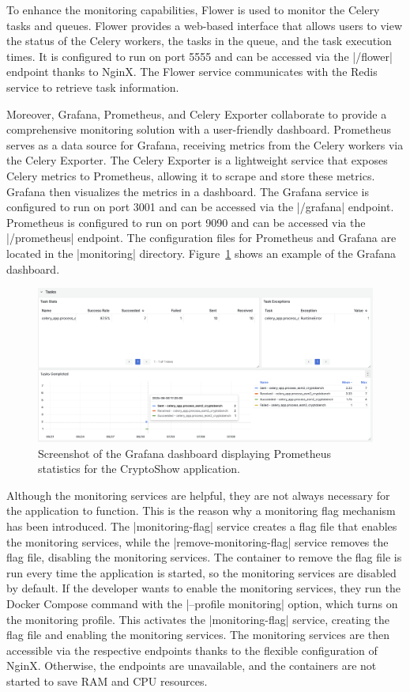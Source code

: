 To enhance the monitoring capabilities, Flower is used to monitor the Celery tasks and queues. Flower provides a web-based interface that allows users to view the status of the Celery workers, the tasks in the queue, and the task execution times. It is configured to run on port 5555 and can be accessed via the \inline|/flower| endpoint thanks to NginX. The Flower service communicates with the Redis service to retrieve task information.

Moreover, Grafana, Prometheus, and Celery Exporter collaborate to provide a comprehensive monitoring solution with a user-friendly dashboard. Prometheus serves as a data source for Grafana, receiving metrics from the Celery workers via the Celery Exporter. The Celery Exporter is a lightweight service that exposes Celery metrics to Prometheus, allowing it to scrape and store these metrics. Grafana then visualizes the metrics in a dashboard. The Grafana service is configured to run on port 3001 and can be accessed via the \inline|/grafana| endpoint. Prometheus is configured to run on port 9090 and can be accessed via the \inline|/prometheus| endpoint. The configuration files for Prometheus and Grafana are located in the \inline|monitoring| directory. Figure~\ref{fig:grafana} shows an example of the Grafana dashboard.

\begin{figure}[htpb]
    \centering
    \includegraphics[width=\textwidth]{img/grafana.png}
    \caption{Screenshot of the Grafana dashboard displaying Prometheus statistics for the CryptoShow application.}
    \label{fig:grafana}
\end{figure}

Although the monitoring services are helpful, they are not always necessary for the application to function. This is the reason why a monitoring flag mechanism has been introduced. The \inline|monitoring-flag| service creates a flag file that enables the monitoring services, while the \inline|remove-monitoring-flag| service removes the flag file, disabling the monitoring services. The container to remove the flag file is run every time the application is started, so the monitoring services are disabled by default. If the developer wants to enable the monitoring services, they run the Docker Compose command with the \inline|--profile monitoring| option, which turns on the monitoring profile. This activates the \inline|monitoring-flag| service, creating the flag file and enabling the monitoring services. The monitoring services are then accessible via the respective endpoints thanks to the flexible configuration of NginX. Otherwise, the endpoints are unavailable, and the containers are not started to save RAM and CPU resources.

